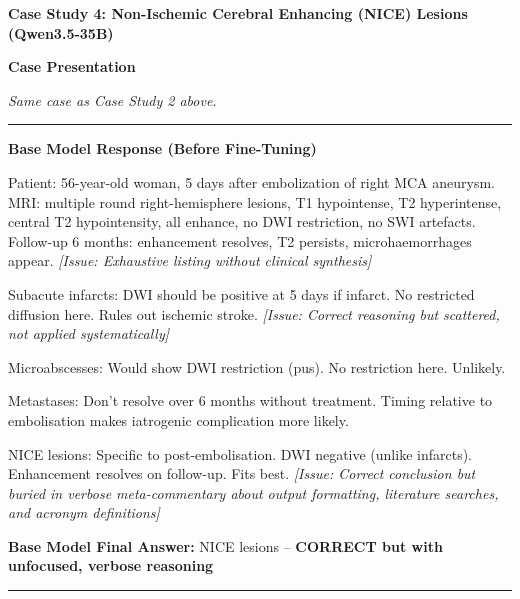 \documentclass[10pt,journal,compsoc, onecolumn]{IEEEtran}
\begin{document}
\begin{casebox}
    \textbf{Case Study 4: Non-Ischemic Cerebral Enhancing (NICE) Lesions (Qwen3.5-35B)}

    \vspace{1em}
    \textbf{Case Presentation}

    \textit{Same case as Case Study 2 above.}

    \vspace{1em}
    \hrule
    \vspace{1em}

    \textbf{Base Model Response (Before Fine-Tuning)}

    \vspace{0.5em}
    Patient: 56-year-old woman, 5 days after embolization of right MCA aneurysm. MRI: multiple round right-hemisphere lesions, T1 hypointense, T2 hyperintense, central T2 hypointensity, all enhance, no DWI restriction, no SWI artefacts. Follow-up 6 months: enhancement resolves, T2 persists, microhaemorrhages appear. \textit{[Issue: Exhaustive listing without clinical synthesis]}

    \vspace{0.5em}
    Subacute infarcts: DWI should be positive at 5 days if infarct. No restricted diffusion here. Rules out ischemic stroke. \textit{[Issue: Correct reasoning but scattered, not applied systematically]}

    \vspace{0.5em}
    Microabscesses: Would show DWI restriction (pus). No restriction here. Unlikely.

    \vspace{0.5em}
    Metastases: Don't resolve over 6 months without treatment. Timing relative to embolisation makes iatrogenic complication more likely.

    \vspace{0.5em}
    NICE lesions: Specific to post-embolisation. DWI negative (unlike infarcts). Enhancement resolves on follow-up. Fits best. \textit{[Issue: Correct conclusion but buried in verbose meta-commentary about output formatting, literature searches, and acronym definitions]}

    \vspace{1em}
    \noindent\textbf{Base Model Final Answer:} \colorbox{green!30}{NICE lesions} -- \textbf{CORRECT but with unfocused, verbose reasoning}

    \vspace{1em}
    \hrule
    \vspace{1em}


\end{casebox}
\end{document}

